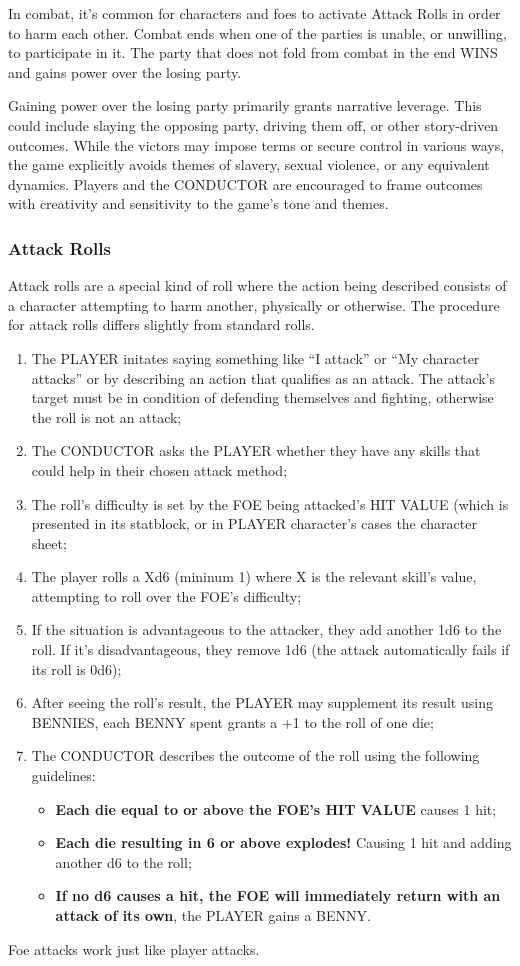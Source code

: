 In combat, it's common for characters and foes to activate Attack Rolls in order to harm each other. Combat ends when one of the parties is unable, or unwilling, to participate in it. The party that does not fold from combat in the end WINS and gains power over the losing party.

Gaining power over the losing party primarily grants narrative leverage. This could include slaying the opposing party, driving them off, or other story-driven outcomes. While the victors may impose terms or secure control in various ways, the game explicitly avoids themes of slavery, sexual violence, or any equivalent dynamics. Players and the CONDUCTOR are encouraged to frame outcomes with creativity and sensitivity to the game's tone and themes.

\subsubsection{Attack Rolls}
Attack rolls are a special kind of roll where the action being described consists of a character attempting to harm another, physically or otherwise. The procedure for attack rolls differs slightly from standard rolls.
\begin{enumerate}
    \item {The PLAYER initates saying something like ``I attack'' or ``My character attacks'' or by describing an action that qualifies as an attack. The attack's target must be in condition of defending themselves and fighting, otherwise the roll is not an attack;}
    \item {The CONDUCTOR asks the PLAYER whether they have any skills that could help in their chosen attack method;}
    \item {The roll's difficulty is set by the FOE being attacked's HIT VALUE (which is presented in its statblock, or in PLAYER character's cases the character sheet;}
    \item {The player rolls a Xd6 (mininum 1) where X is the relevant skill's value, attempting to roll over the FOE's difficulty;}
    \item {If the situation is advantageous to the attacker, they add another 1d6 to the roll. If it's disadvantageous, they remove 1d6 (the attack automatically fails if its roll is 0d6);}
    \item {After seeing the roll's result, the PLAYER may supplement its result using BENNIES, each BENNY spent grants a +1 to the roll of one die;}
    \item {The CONDUCTOR describes the outcome of the roll using the following guidelines:}
    \begin{itemize}
        \item {\textbf{Each die equal to or above the FOE's HIT VALUE} causes 1 hit;}
        \item {\textbf{Each die resulting in 6 or above explodes!} Causing 1 hit and adding another d6 to the roll;}
        \item {\textbf{If no d6 causes a hit, the FOE will immediately return with an attack of its own}, the PLAYER gains a BENNY.}
    \end{itemize}
\end{enumerate}
Foe attacks work just like player attacks.

